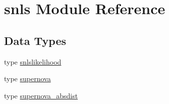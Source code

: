 \hypertarget{namespacesnls}{}\section{snls Module Reference}
\label{namespacesnls}
\subsection*{Data Types}
\begin{DoxyCompactItemize}
\item 
type \mbox{\hyperlink{structsnls_1_1snlslikelihood}{snlslikelihood}}
\item 
type \mbox{\hyperlink{structsnls_1_1supernova}{supernova}}
\item 
type \mbox{\hyperlink{structsnls_1_1supernova__absdist}{supernova\+\_\+absdist}}
\end{DoxyCompactItemize}
